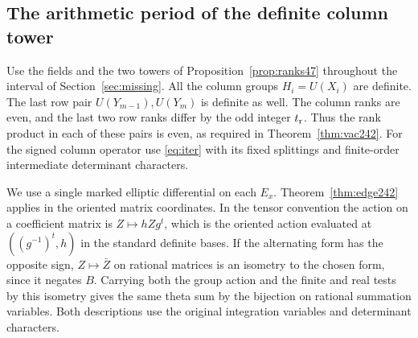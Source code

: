 \documentclass[a4paper,11pt]{article}
\theoremstyle{definition}
\theoremstyle{remark}
\numberwithin{equation}{section}
\begin{document}
\subsection{The arithmetic period of the definite column tower}\label{nav:I-51}
Use the fields and the two towers of Proposition~\ref{prop:ranks47}
throughout the interval of Section~\ref{sec:missing}. All the
column groups \(H_i=U(X_i)\) are definite. The last row pair
\(U(Y_{m-1}),U(Y_m)\) is definite as well. The column ranks
are even, and the last two row ranks differ by the odd integer
\(t_{\rm r}\). Thus the rank product in each of these pairs is
even, as required in Theorem~\ref{thm:vac242}. For the signed
column operator use \eqref{eq:iter} with its fixed splittings and
finite-order intermediate determinant characters.

We use a single marked elliptic differential on each \(E_x\).
Theorem~\ref{thm:edge242} applies in the oriented matrix coordinates.
In the tensor convention the action on a coefficient matrix is
\(Z\mapsto h Zg^t\), which is the oriented action evaluated at
\(((g^{-1})^t,h)\) in the standard definite bases. If the
alternating form has the opposite sign, \(Z\mapsto\bar Z\) on
rational matrices is an isometry to the chosen form, since it
negates \(B\). Carrying both the group action and the finite and
real tests by this isometry gives the same theta sum by the
bijection on rational summation variables. Both descriptions use
the original integration variables and determinant characters.
\end{document}
